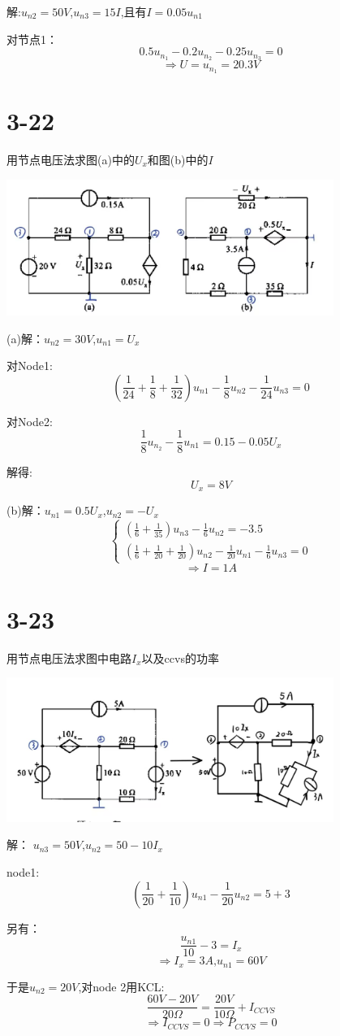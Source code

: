 \documentclass{article}
\begin{document}
解:$u_{n2}=50V$,$u_{n3}=15I$,且有$I=0.05u_{n1}$

对节点1：
\[0.5u_{n_1}-0.2u_{n_2}-0.25u_{n_3}=0\]\[
\Rightarrow U=u_{n_1}=20.3V
\]
\section*{3-22}
用节点电压法求图(a)中的$U_x$和图(b)中的$I$
\begin{center}
\includegraphics[width=0.8\textwidth,height=0.2\textheight]{3-22.jpg}
\end{center}

(a)解：$u_{n2}=30V$,$u_{n1}=U_x$

对Node1:
\[(\frac{1}{24}+\frac{1}{8}+\frac{1}{32})u_{n1}-
\frac{1}{8}u_{n2}-\frac{1}{24}u_{n3}=0\]

对Node2:
\[
\frac{1}{8}u_{n_2}-\frac{1}{8}u_{n1}=0.15-0.05U_x
\]

解得:
\[U_x=8V\]

(b)解：$u_{n1}=0.5U_x$,$u_{n2}=-U_x$
\[\begin{cases}
    (\frac{1}{6}+\frac{1}{35})u_{n3}-\frac{1}{6}u_{n2}=-3.5\\
    (\frac{1}{6}+\frac{1}{20}+\frac{1}{20})u_{n2}-\frac{1}{20}u_{n1}-\frac{1}{6}u_{n3}=0
\end{cases}\]
\[\Rightarrow
I=1A\]
\section*{3-23}
用节点电压法求图中电路$I_x$以及ccvs的功率
\begin{center}
\includegraphics[width=0.8\textwidth,height=0.2\textheight]{3-23.jpg}
\end{center}

解：
$u_{n3}=50V$,$u_{n2}=50-10I_x$

node1:
\[
(\frac{1}{20}+\frac{1}{10})u_{n1}-\frac{1}{20}u_{n2}=5+3
\]

另有：
\[
\frac{u_{n1}}{10}-3=I_x
\]
\[
\Rightarrow I_x=3A\text{,}u_{n1}=60V
\]

于是$u_{n2}=20V$,对node 2用KCL:
\[
\frac{60V-20V}{20\Omega}=\frac{20V}{10\Omega}+I_{CCVS}
\]
\[\Rightarrow I_{CCVS}=0\Rightarrow P_{CCVS}=0
\]
\end{document}
